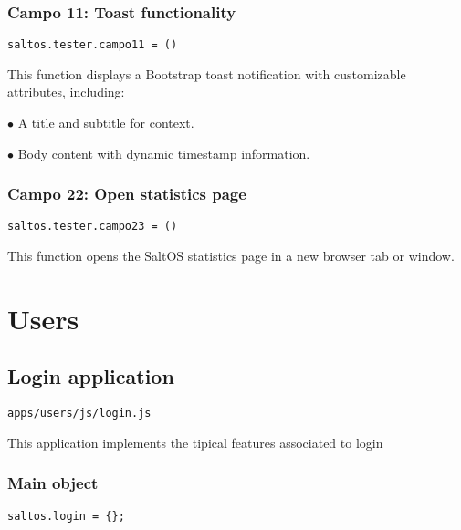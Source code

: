 \documentclass[a4paper]{article}
\begin{document}
\hypertarget{toc154}{}
\subsubsection{Campo 11: Toast functionality}

\begin{lstlisting}
saltos.tester.campo11 = ()
\end{lstlisting}

This function displays a Bootstrap toast notification with customizable attributes, including:

\begin{compactitem}
\item[\color{myblue}$\bullet$] A title and subtitle for context.
\item[\color{myblue}$\bullet$] Body content with dynamic timestamp information.
\end{compactitem}

\hypertarget{toc155}{}
\subsubsection{Campo 22: Open statistics page}

\begin{lstlisting}
saltos.tester.campo23 = ()
\end{lstlisting}

This function opens the SaltOS statistics page in a new browser tab or window.


\hypertarget{toc156}{}
\section{Users}

\hypertarget{toc157}{}
\subsection{Login application}

\begin{lstlisting}
apps/users/js/login.js
\end{lstlisting}

This application implements the tipical features associated to login

\hypertarget{toc158}{}
\subsubsection{Main object}

\begin{lstlisting}
saltos.login = {};
\end{lstlisting}
\end{document}

